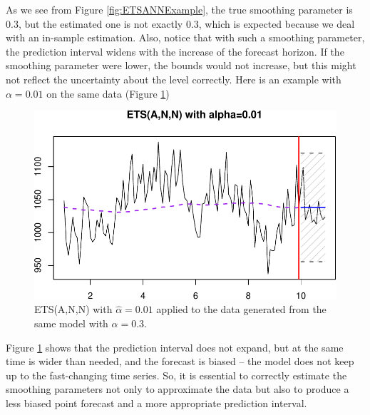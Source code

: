 \documentclass[]{book}
\newenvironment{Shaded}{\begin{snugshade}}{\end{snugshade}}
\newcommand{\DataTypeTok}[1]{\textcolor[rgb]{0.13,0.29,0.53}{#1}}
\newcommand{\DecValTok}[1]{\textcolor[rgb]{0.00,0.00,0.81}{#1}}
\newcommand{\FloatTok}[1]{\textcolor[rgb]{0.00,0.00,0.81}{#1}}
\newcommand{\KeywordTok}[1]{\textcolor[rgb]{0.13,0.29,0.53}{\textbf{#1}}}
\newcommand{\NormalTok}[1]{#1}
\newcommand{\OperatorTok}[1]{\textcolor[rgb]{0.81,0.36,0.00}{\textbf{#1}}}
\newcommand{\OtherTok}[1]{\textcolor[rgb]{0.56,0.35,0.01}{#1}}
\newcommand{\StringTok}[1]{\textcolor[rgb]{0.31,0.60,0.02}{#1}}
\theoremstyle{definition}
\theoremstyle{definition}
\theoremstyle{definition}
\theoremstyle{definition}
\theoremstyle{remark}
\begin{document}
As we see from Figure \ref{fig:ETSANNExample}, the true smoothing parameter is 0.3, but the estimated one is not exactly 0.3, which is expected because we deal with an in-sample estimation. Also, notice that with such a smoothing parameter, the prediction interval widens with the increase of the forecast horizon. If the smoothing parameter were lower, the bounds would not increase, but this might not reflect the uncertainty about the level correctly. Here is an example with \(\alpha=0.01\) on the same data (Figure \ref{fig:ETSANNExamplealpha01})

\begin{Shaded}
\end{Shaded}

\begin{figure}
\centering
\includegraphics{Svetunkov--2022----ADAM_files/figure-latex/ETSANNExamplealpha01-1.pdf}
\caption{\label{fig:ETSANNExamplealpha01}ETS(A,N,N) with \(\hat{\alpha}=0.01\) applied to the data generated from the same model with \(\alpha=0.3\).}
\end{figure}

Figure \ref{fig:ETSANNExamplealpha01} shows that the prediction interval does not expand, but at the same time is wider than needed, and the forecast is biased -- the model does not keep up to the fast-changing time series. So, it is essential to correctly estimate the smoothing parameters not only to approximate the data but also to produce a less biased point forecast and a more appropriate prediction interval.
\end{document}
